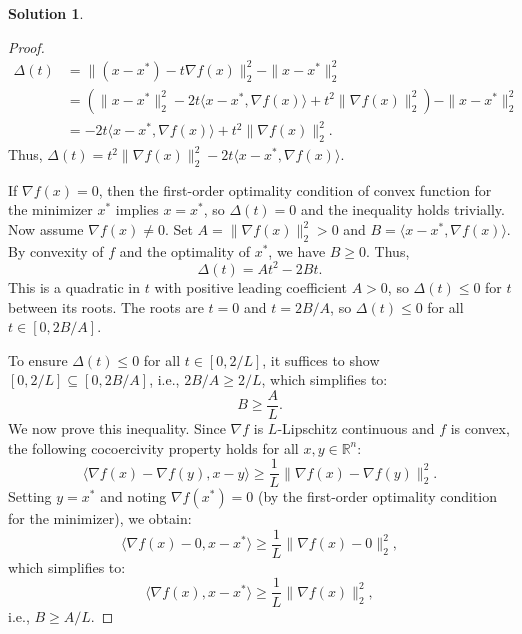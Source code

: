\documentclass[12pt]{article}
\theoremstyle{definition}
\newtheorem*{solution}{\normalfont\textbf{Solution}}
\begin{document}
\begin{enumerate}[leftmargin=*]
\begin{solution}
\begin{proof}
                \[
                \begin{aligned}
                \Delta(t) &= \| (x - x^*) - t\nabla f(x) \|_2^2 - \| x - x^* \|_2^2 \\
                &= \left( \| x - x^* \|_2^2 - 2t \langle x - x^*, \nabla f(x) \rangle + t^2 \| \nabla f(x) \|_2^2 \right) - \| x - x^* \|_2^2 \\
                &= -2t \langle x - x^*, \nabla f(x) \rangle + t^2 \| \nabla f(x) \|_2^2.
                \end{aligned}
                \]
                Thus, \(\Delta(t) = t^2 \| \nabla f(x) \|_2^2 - 2t \langle x - x^*, \nabla f(x) \rangle\).

                If \(\nabla f(x) = 0\), then the first-order optimality condition of convex function for the minimizer \(x^*\) implies \(x = x^*\), so \(\Delta(t) = 0\) and the inequality holds trivially. Now assume \(\nabla f(x) \neq 0\). Set \(A = \| \nabla f(x) \|_2^2 > 0\) and \(B = \langle x - x^*, \nabla f(x) \rangle\). By convexity of \(f\) and the optimality of \(x^*\), we have \(B \geq 0\). Thus,
                \[
                \Delta(t) = A t^2 - 2B t.
                \]
                This is a quadratic in \(t\) with positive leading coefficient \(A > 0\), so \(\Delta(t) \leq 0\) for \(t\) between its roots. The roots are \(t = 0\) and \(t = 2B/A\), so \(\Delta(t) \leq 0\) for all \(t \in [0, 2B/A]\).

                To ensure \(\Delta(t) \leq 0\) for all \(t \in [0, 2/L]\), it suffices to show \([0, 2/L] \subseteq [0, 2B/A]\), i.e., \(2B/A \geq 2/L\), which simplifies to:
                \[
                B \geq \frac{A}{L}.
                \]
                We now prove this inequality. Since \(\nabla f\) is \(L\)-Lipschitz continuous and \(f\) is convex, the following cocoercivity property holds for all \(x, y \in \mathbb{R}^n\):
                \begin{equation}
                \langle \nabla f(x) - \nabla f(y), x - y \rangle \geq \frac{1}{L} \| \nabla f(x) - \nabla f(y) \|_2^2. \label{eq:cocoercivity}
                \end{equation}
                Setting \(y = x^*\) and noting \(\nabla f(x^*) = 0\) (by the first-order optimality condition for the minimizer), we obtain:
                \[
                \langle \nabla f(x) - 0, x - x^* \rangle \geq \frac{1}{L} \| \nabla f(x) - 0 \|_2^2,
                \]
                which simplifies to:
                \[
                \langle \nabla f(x), x - x^* \rangle \geq \frac{1}{L} \| \nabla f(x) \|_2^2,
                \]
                i.e., \(B \geq A/L\).


\end{proof}
\end{solution}
\end{enumerate}
\end{document}
